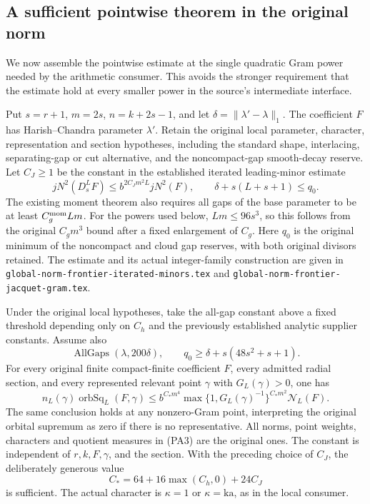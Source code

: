 \subsection{A sufficient pointwise theorem in the original norm}
\label{sec:archimedean-pointwise-assembly}

We now assemble the pointwise estimate at the single quadratic
Gram power needed by the arithmetic consumer. This avoids the
stronger requirement that the estimate hold at every smaller
power in the source's intermediate interface.

Put \(s=r+1\), \(m=2s\), \(n=k+2s-1\), and let
\(\delta=\|\lambda'-\lambda\|_1\). The coefficient \(F\)
has Harish--Chandra parameter \(\lambda'\). Retain the original local
parameter, character, representation and section hypotheses,
including the standard shape, interlacing, separating-gap or
cut alternative, and the noncompact-gap smooth-decay reserve.
Let \(C_J\ge1\) be the constant in the established iterated
leading-minor estimate
\[
 jN^2(D_s^L F)\le b^{2C_Jm^2L}jN^2(F),
 \qquad \delta+s(L+s+1)\le q_0 .                       \tag{PA1}
\]
The existing moment theorem also requires all gaps of the base
parameter to be at least \(C_g^{\rm mom}Lm\). For the powers
used below, \(Lm\le96s^3\), so this follows from the original
\(C_gm^3\) bound after a fixed enlargement of \(C_g\).
Here \(q_0\) is the original minimum of the noncompact and cloud
gap reserves, with both original divisors retained. The estimate
and its actual integer-family construction are given in
\texttt{global-norm-frontier-iterated-minors.tex} and
\texttt{global-norm-frontier-jacquet-gram.tex}.\cite{current-construction-record}

\begin{theorem}
\label{thm:archimedean-pointwise-sufficient}
Under the original local hypotheses, take the all-gap constant
above a fixed threshold depending only on \(C_h\) and the
previously established analytic supplier constants. Assume also
\[
 \operatorname{AllGaps}(\lambda,200\delta),\qquad
                    q_0\ge\delta+s(48s^2+s+1).         \tag{PA2}
\]
For every original finite compact-finite coefficient \(F\), every
admitted radial section, and every represented relevant point
\(\gamma\) with \(G_L(\gamma)>0\), one has
\[
 n_L(\gamma)\operatorname{orbSq}_L(F,\gamma)
 \le b^{C_*m^4}\max\{1,G_L(\gamma)^{-1}\}^{C_*m^2}
                              \mathcal N_L(F).          \tag{PA3}
\]
The same conclusion holds at any nonzero-Gram point, interpreting
the original orbital supremum as zero if there is no representative.
All norms, point weights, characters and quotient measures in
(PA3) are the original ones. The constant is independent of
\(r,k,F,\gamma\), and the section. With the preceding choice
of \(C_J\), the deliberately generous value
\[
               C_*=64+16\max(C_h,0)+24C_J              \tag{PA4}
\]
is sufficient. The actual character is \(\kappa=1\) or
\(\kappa=\mathrm{ka}\), as in the local consumer.
\end{theorem}


